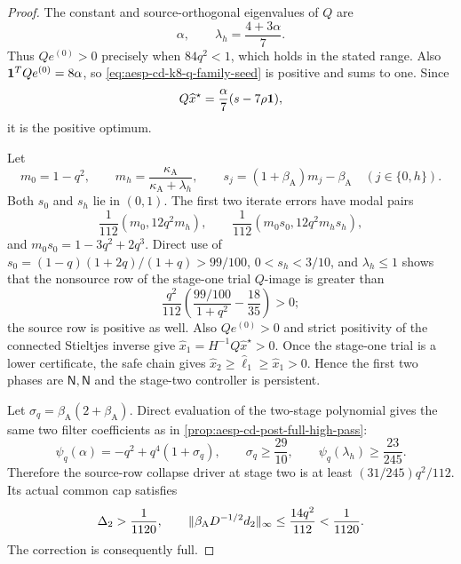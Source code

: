 \begin{proof}
The constant and source-orthogonal eigenvalues of $Q$ are
\begin{equation*}
 \alpha,
 \qquad \lambda_h=\frac{4+3\alpha}{7}.
\end{equation*}
Thus $Qe^{(0)}>0$ precisely when $84q^2<1$, which holds in the stated
range.  Also $\mathbf{1}^TQe^{(0)}=8\alpha$, so
\cref{eq:aesp-cd-k8-q-family-seed} is positive and sums to one.  Since
\begin{equation*}
 Q\widehat x^\star
 =\frac\alpha7(s-7\rho\mathbf{1}),
\end{equation*}
it is the positive optimum.

Let
\begin{equation*}
 m_0=1-q^2,
 \qquad m_h=\frac{\kappa_{\mathrm A}}
                  {\kappa_{\mathrm A}+\lambda_h},
 \qquad
 s_j=(1+\beta_{\mathrm A})m_j-\beta_{\mathrm A}
 \quad(j\in\{0,h\}).
\end{equation*}
Both $s_0$ and $s_h$ lie in $(0,1)$.  The first two iterate errors have
modal pairs
\begin{equation*}
 \frac1{112}(m_0,12q^2m_h),
 \qquad
 \frac1{112}(m_0s_0,12q^2m_hs_h),
\end{equation*}
and $m_0s_0=1-3q^2+2q^3$.  Direct use of
$s_0=(1-q)(1+2q)/(1+q)>99/100$, $0<s_h<3/10$, and
$\lambda_h\leq1$ shows that the nonsource row of the stage-one trial
$Q$-image is greater than
\begin{equation*}
 \frac{q^2}{112}
 \left(\frac{99/100}{1+q^2}-\frac{18}{35}\right)>0;
\end{equation*}
the source row is positive as well.  Also $Qe^{(0)}>0$ and strict positivity
of the connected Stieltjes inverse give
$\widehat x_1=H^{-1}Q\widehat x^\star>0$.  Once the stage-one trial is a
lower certificate, the safe chain gives
$\widehat x_2\geq\widehat\ell_1\geq\widehat x_1>0$.  Hence the first two
phases are $\mathsf N,\mathsf N$ and the stage-two controller is persistent.

Let $\sigma_q=\beta_{\mathrm A}(2+\beta_{\mathrm A})$.  Direct evaluation
of the two-stage polynomial gives the same two filter coefficients as in
\cref{prop:aesp-cd-post-full-high-pass}:
\begin{equation*}
 \psi_q(\alpha)=-q^2+q^4(1+\sigma_q),
 \qquad
 \sigma_q\geq\frac{29}{10},
 \qquad
 \psi_q(\lambda_h)\geq\frac{23}{245}.
\end{equation*}
Therefore the source-row collapse driver at stage two is at least
$(31/245)q^2/112$.  Its actual common cap satisfies
\begin{equation*}
 \Delta_2>\frac1{1120},
 \qquad
 \lVert\beta_{\mathrm A}D^{-1/2}d_2\rVert_\infty
 \leq\frac{14q^2}{112}<\frac1{1120}.
\end{equation*}
The correction is consequently full.


\end{proof}
